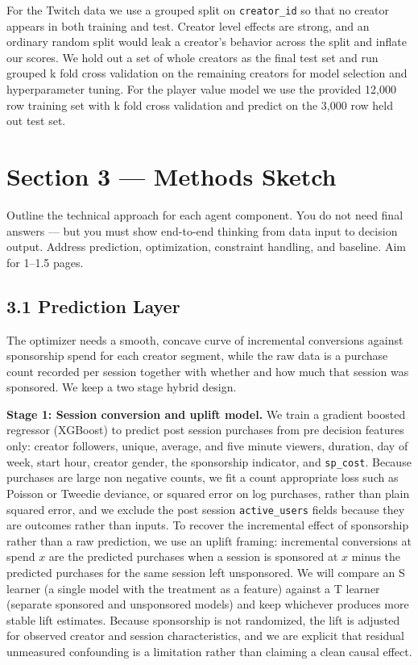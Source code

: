 \documentclass[11pt]{article}
\begin{document}
For the Twitch data we use a grouped split on \texttt{creator\_id} so that no creator appears in both training and test. Creator level effects are strong, and an ordinary random split would leak a creator's behavior across the split and inflate our scores. We hold out a set of whole creators as the final test set and run grouped k fold cross validation on the remaining creators for model selection and hyperparameter tuning. For the player value model we use the provided 12,000 row training set with k fold cross validation and predict on the 3,000 row held out test set.


\section{Section 3 — Methods Sketch}

\begin{hint}
  Outline the technical approach for each agent component. You do not need final
  answers --- but you must show end-to-end thinking from data input to decision
  output. Address prediction, optimization, constraint handling, and baseline.
  Aim for 1--1.5 pages.
\end{hint}


\subsection*{3.1 \; Prediction Layer}

The optimizer needs a smooth, concave curve of incremental conversions against sponsorship spend for each creator segment, while the raw data is a purchase count recorded per session together with whether and how much that session was sponsored. We keep a two stage hybrid design.

\textbf{Stage 1: Session conversion and uplift model.} We train a gradient boosted regressor (XGBoost) to predict post session purchases from pre decision features only: creator followers, unique, average, and five minute viewers, duration, day of week, start hour, creator gender, the sponsorship indicator, and \texttt{sp\_cost}. Because purchases are large non negative counts, we fit a count appropriate loss such as Poisson or Tweedie deviance, or squared error on log purchases, rather than plain squared error, and we exclude the post session \texttt{active\_users} fields because they are outcomes rather than inputs. To recover the incremental effect of sponsorship rather than a raw prediction, we use an uplift framing: incremental conversions at spend $x$ are the predicted purchases when a session is sponsored at $x$ minus the predicted purchases for the same session left unsponsored. We will compare an S learner (a single model with the treatment as a feature) against a T learner (separate sponsored and unsponsored models) and keep whichever produces more stable lift estimates. Because sponsorship is not randomized, the lift is adjusted for observed creator and session characteristics, and we are explicit that residual unmeasured confounding is a limitation rather than claiming a clean causal effect.
\end{document}
